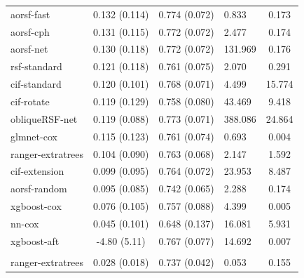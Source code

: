 \documentclass[twoside,11pt]{article}\usepackage[]{graphicx}\usepackage[]{xcolor}
\newenvironment{knitrout}{}{} %
\begin{document}
\begin{knitrout}
\begin{longtable}[t]{lcclc}
\endfoot
\bottomrule
\endlastfoot
\addlinespace[0.3em]
\hline
\multicolumn{5}{l}{\textit{\textbf{Overall}}}\\
\hline
\hspace{1em}aorsf-fast & 0.132 (0.114) & 0.774 (0.072) & 0.833 & 0.173\\
\hspace{1em}aorsf-cph & 0.131 (0.115) & 0.772 (0.072) & 2.477 & 0.174\\
\hspace{1em}aorsf-net & 0.130 (0.118) & 0.772 (0.072) & 131.969 & 0.176\\
\hspace{1em}rsf-standard & 0.121 (0.118) & 0.761 (0.075) & 2.070 & 0.291\\
\hspace{1em}cif-standard & 0.120 (0.101) & 0.768 (0.071) & 4.499 & 15.774\\
\hspace{1em}cif-rotate & 0.119 (0.129) & 0.758 (0.080) & 43.469 & 9.418\\
\hspace{1em}obliqueRSF-net & 0.119 (0.088) & 0.773 (0.071) & 388.086 & 24.864\\
\hspace{1em}glmnet-cox & 0.115 (0.123) & 0.761 (0.074) & 0.693 & 0.004\\
\hspace{1em}ranger-extratrees & 0.104 (0.090) & 0.763 (0.068) & 2.147 & 1.592\\
\hspace{1em}cif-extension & 0.099 (0.095) & 0.764 (0.072) & 23.953 & 8.487\\
\hspace{1em}aorsf-random & 0.095 (0.085) & 0.742 (0.065) & 2.288 & 0.174\\
\hspace{1em}xgboost-cox & 0.076 (0.105) & 0.757 (0.088) & 4.399 & 0.005\\
\hspace{1em}nn-cox & 0.045 (0.101) & 0.648 (0.137) & 16.081 & 5.931\\
\hspace{1em}xgboost-aft & -4.80 (5.11) & 0.767 (0.077) & 14.692 & 0.007\\
\addlinespace[0.3em]
\hline
\multicolumn{5}{l}{\textit{\textbf{ACTG 320; AIDS diagnosis, n = 1151, p = 12}}}\\
\hline
\hspace{1em}ranger-extratrees & 0.028 (0.018) & 0.737 (0.042) & 0.053 & 0.155\\

\end{longtable}
\end{knitrout}
\end{document}
